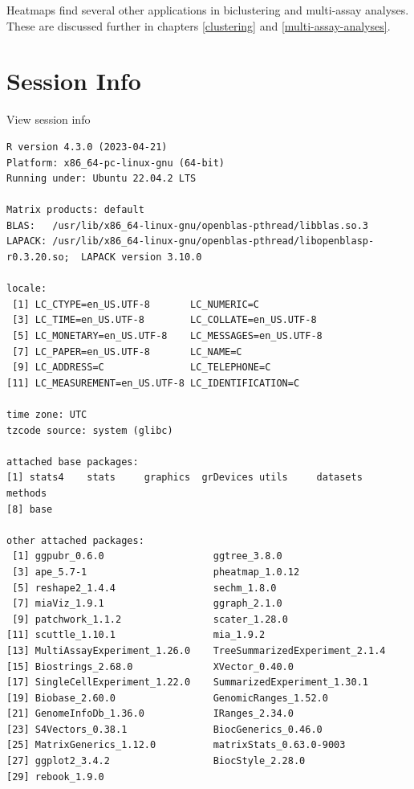 \documentclass[
]{book}
\begin{document}
Heatmaps find several other applications in biclustering and
multi-assay analyses. These are discussed further in chapters
\ref{clustering} and \ref{multi-assay-analyses}.

\hypertarget{session-info-10}{%
\section*{Session Info}\label{session-info-10}}

View session info

\begin{verbatim}
R version 4.3.0 (2023-04-21)
Platform: x86_64-pc-linux-gnu (64-bit)
Running under: Ubuntu 22.04.2 LTS

Matrix products: default
BLAS:   /usr/lib/x86_64-linux-gnu/openblas-pthread/libblas.so.3 
LAPACK: /usr/lib/x86_64-linux-gnu/openblas-pthread/libopenblasp-r0.3.20.so;  LAPACK version 3.10.0

locale:
 [1] LC_CTYPE=en_US.UTF-8       LC_NUMERIC=C              
 [3] LC_TIME=en_US.UTF-8        LC_COLLATE=en_US.UTF-8    
 [5] LC_MONETARY=en_US.UTF-8    LC_MESSAGES=en_US.UTF-8   
 [7] LC_PAPER=en_US.UTF-8       LC_NAME=C                 
 [9] LC_ADDRESS=C               LC_TELEPHONE=C            
[11] LC_MEASUREMENT=en_US.UTF-8 LC_IDENTIFICATION=C       

time zone: UTC
tzcode source: system (glibc)

attached base packages:
[1] stats4    stats     graphics  grDevices utils     datasets  methods  
[8] base     

other attached packages:
 [1] ggpubr_0.6.0                   ggtree_3.8.0                  
 [3] ape_5.7-1                      pheatmap_1.0.12               
 [5] reshape2_1.4.4                 sechm_1.8.0                   
 [7] miaViz_1.9.1                   ggraph_2.1.0                  
 [9] patchwork_1.1.2                scater_1.28.0                 
[11] scuttle_1.10.1                 mia_1.9.2                     
[13] MultiAssayExperiment_1.26.0    TreeSummarizedExperiment_2.1.4
[15] Biostrings_2.68.0              XVector_0.40.0                
[17] SingleCellExperiment_1.22.0    SummarizedExperiment_1.30.1   
[19] Biobase_2.60.0                 GenomicRanges_1.52.0          
[21] GenomeInfoDb_1.36.0            IRanges_2.34.0                
[23] S4Vectors_0.38.1               BiocGenerics_0.46.0           
[25] MatrixGenerics_1.12.0          matrixStats_0.63.0-9003       
[27] ggplot2_3.4.2                  BiocStyle_2.28.0              
[29] rebook_1.9.0                  


\end{verbatim}
\end{document}
